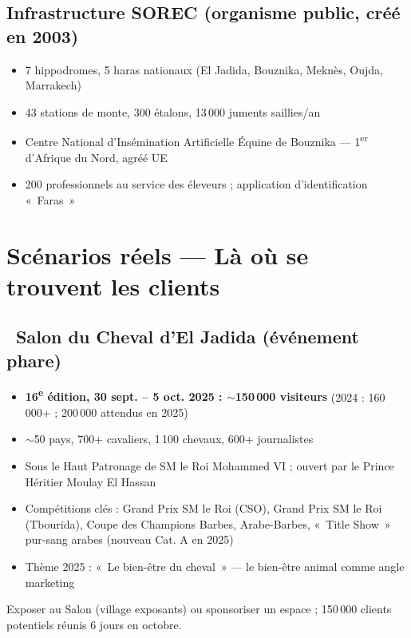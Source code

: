 \documentclass[11pt,a4paper]{article}
\begin{document}
\subsection{Infrastructure SOREC (organisme public, créé en 2003)}
\begin{itemize}
  \item 7 hippodromes, 5 haras nationaux (El Jadida, Bouznika, Meknès, Oujda, Marrakech)
  \item 43 stations de monte, 300 étalons, 13\,000 juments saillies/an
  \item Centre National d'Insémination Artificielle Équine de Bouznika --- 1\textsuperscript{er} d'Afrique du Nord, agréé UE
  \item 200 professionnels au service des éleveurs ; application d'identification «~Faras~»
\end{itemize}

\section{Scénarios réels --- Là où se trouvent les clients}

\subsection{\faFlag\ Salon du Cheval d'El Jadida (événement phare)}
\begin{itemize}
  \item \textbf{16\textsuperscript{e} édition, 30 sept. -- 5 oct. 2025 : $\sim$150\,000 visiteurs} (2024 : 160\,000+ ; 200\,000 attendus en 2025)
  \item $\sim$50 pays, 700+ cavaliers, 1\,100 chevaux, 600+ journalistes
  \item Sous le Haut Patronage de SM le Roi Mohammed VI ; ouvert par le Prince Héritier Moulay El Hassan
  \item Compétitions clés : Grand Prix SM le Roi (CSO), Grand Prix SM le Roi (Tbourida), Coupe des Champions Barbes, Arabe-Barbes, «~Title Show~» pur-sang arabes (nouveau Cat. A en 2025)
  \item Thème 2025 : «~Le bien-être du cheval~» --- le bien-être animal comme angle marketing
\end{itemize}

\begin{actionbox}
Exposer au Salon (village exposants) ou sponsoriser un espace ; 150\,000 clients potentiels réunis 6 jours en octobre.
\end{actionbox}
\end{document}
